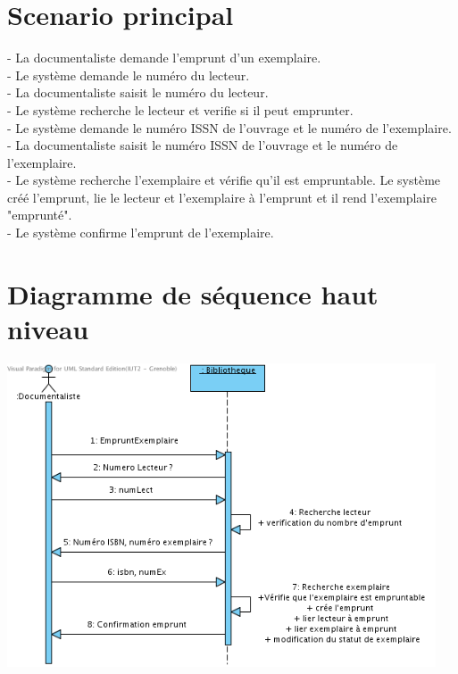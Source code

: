 \documentclass[a4paper,10pt]{report}
\begin{document}
\bigskip
\section*{Scenario principal}
\begin{flushleft}
- La documentaliste demande l'emprunt d'un exemplaire.\\
- Le système demande le numéro du lecteur.\\
- La documentaliste saisit le numéro du lecteur.\\
- Le système recherche le lecteur et verifie si il peut emprunter.\\
- Le système demande le numéro ISSN de l'ouvrage et le numéro de l'exemplaire.\\
- La documentaliste saisit le numéro ISSN de l'ouvrage et le numéro de l'exemplaire.\\
- Le système recherche l'exemplaire et vérifie qu'il est empruntable. Le système créé l'emprunt, lie le lecteur et l'exemplaire à l'emprunt et il rend l'exemplaire "emprunté".\\
- Le système confirme l'emprunt de l'exemplaire.\\
\end{flushleft}

\bigskip

\section*{Diagramme de séquence haut niveau}
\includegraphics[height=90mm]{EmpruntExemplaireHautNiveau.png}
\end{document}
